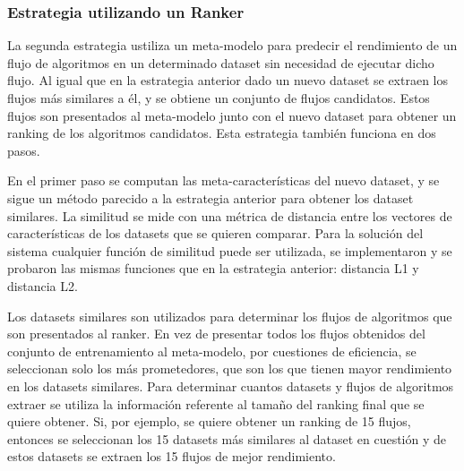 \subsubsection{Estrategia utilizando un Ranker}\label{subsub:ranker}


La segunda estrategia ustiliza un meta-modelo para predecir el rendimiento de un flujo de algoritmos en un determinado dataset sin necesidad de ejecutar dicho flujo. Al igual que en la estrategia anterior dado un nuevo dataset se extraen los flujos más similares a él, y se obtiene un conjunto de flujos candidatos. Estos flujos son presentados al meta-modelo junto con el nuevo dataset para obtener un ranking de los algoritmos candidatos. Esta estrategia también funciona en dos pasos.

En el primer paso se computan las meta-características del nuevo dataset, y se sigue un método parecido a la estrategia anterior para obtener los dataset similares. La similitud se mide con una métrica de distancia entre los vectores de características de los datasets que se quieren comparar. Para la solución del sistema cualquier función de similitud puede ser utilizada, se implementaron y se probaron las mismas funciones que en la estrategia anterior: distancia L1 y distancia L2.

Los datasets similares son utilizados para determinar los flujos de algoritmos que son presentados al ranker. En vez de presentar todos los flujos obtenidos del conjunto de entrenamiento al meta-modelo, por cuestiones de eficiencia, se seleccionan solo los más prometedores, que son los que tienen mayor rendimiento en los datasets similares. Para determinar cuantos datasets y flujos de algoritmos extraer se utiliza la información referente al tamaño del ranking final que se quiere obtener. Si, por ejemplo, se quiere obtener un ranking de 15 flujos, entonces se seleccionan los 15 datasets más similares al dataset en cuestión y de estos datasets se extraen los 15 flujos de mejor rendimiento. 

